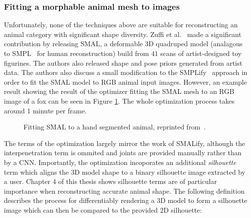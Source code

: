     \subsubsection{Fitting a morphable animal mesh to images}
    Unfortunately, none of the techniques above are suitable for reconstructing an animal category with significant shape diversity.     Zuffi et al.~\cite{zuffi2017menagerie} made a significant contribution by releasing SMAL, a deformable 3D quadruped model (analagous to SMPL~\cite{loper15smpl} for human reconstruction) build from $41$ scans of artist-designed toy figurines. The authors also released shape and pose priors generated from artist data. The authors also discuss a small modification to the SMPLify~ approach in order to fit the SMAL model to RGB animal input images. However, an example result showing the result of the optimizer fitting the SMAL mesh to an RGB image of a fox can be seen in Figure \ref{fig:smalify}. The whole optimization process takes around 1 minute per frame. 

    \begin{figure}[t] %
        \caption{Fitting SMAL to a hand segmented animal, reprinted from~\cite{zuffi2017menagerie}.}
        \label{fig:smalify}
    \end{figure}

    The terms of the optimization largely mirror the work of SMALify, although the interpenetration term is ommited and joints are provided manually rather than by a CNN. Importantly, the optimization incoporates an additional \emph{silhouette} term which aligns the 3D model shape to a binary silhouette image extracted by a user. Chapter 4 of this thesis shows silhouette terms are of particular importance when reconstructing accurate animal shape. The following definition describes the process for differentiably rendering a 3D model to form a silhouette image which can then be compared to the provided 2D silhouette:

